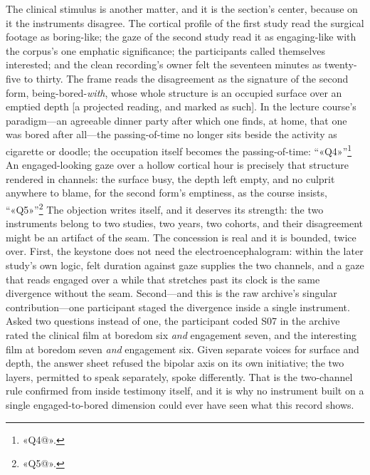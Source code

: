 The clinical stimulus is another matter, and it is the section's center, because on it the instruments disagree. The cortical profile of the first study read the surgical footage as boring-like; the gaze of the second study read it as engaging-like with the corpus's one emphatic significance; the participants called themselves interested; and the clean recording's owner felt the seventeen minutes as twenty-five to thirty. The frame reads the disagreement as the signature of the second form, being-bored-\textit{with}, whose whole structure is an occupied surface over an emptied depth [a projected reading, and marked as such]. In the lecture course's paradigm---an agreeable dinner party after which one finds, at home, that one was bored after all---the passing-of-time no longer sits beside the activity as cigarette or doodle; the occupation itself becomes the passing-of-time: ``«Q4»''\footnote{«Q4@».} An engaged-looking gaze over a hollow cortical hour is precisely that structure rendered in channels: the surface busy, the depth left empty, and no culprit anywhere to blame, for the second form's emptiness, as the course insists, ``«Q5»''\footnote{«Q5@».} The objection writes itself, and it deserves its strength: the two instruments belong to two studies, two years, two cohorts, and their disagreement might be an artifact of the seam. The concession is real and it is bounded, twice over. First, the keystone does not need the electroencephalogram: within the later study's own logic, felt duration against gaze supplies the two channels, and a gaze that reads engaged over a while that stretches past its clock is the same divergence without the seam. Second---and this is the raw archive's singular contribution---one participant staged the divergence inside a single instrument. Asked two questions instead of one, the participant coded S07 in the archive rated the clinical film at boredom six \textit{and} engagement seven, and the interesting film at boredom seven \textit{and} engagement six. Given separate voices for surface and depth, the answer sheet refused the bipolar axis on its own initiative; the two layers, permitted to speak separately, spoke differently. That is the two-channel rule confirmed from inside testimony itself, and it is why no instrument built on a single engaged-to-bored dimension could ever have seen what this record shows.

